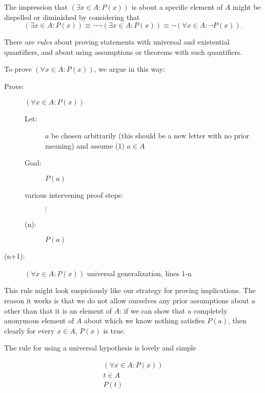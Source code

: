 \documentclass[12pt]{article}
\begin{document}
The impression that $(\exists x \in A:P(x))$ is about a specific element of $A$ might be dispelled or diminished by considering that
$$(\exists x \in A:P(x)) \equiv \neg\neg (\exists x \in A:P(x)) \equiv \neg(\forall x\in A : \neg P(x)).$$

There are {\em rules\/} about proving statements with universal and existential quantifiers, and about using assumptions or theorems with such quantifiers.

To prove $(\forall x \in A:P(x))$, we argue in this way:

\begin{description}
\item[Prove:]  $(\forall x \in A:P(x))$

\begin{description}

\item[Let:]  $a$ be chosen arbitrarily (this should be a new letter with no prior meaning) and assume (1) $a \in A$
\item[Goal:]  $P(a)$

\item[various intervening proof steps:] $\vdots$

\item[(n):]  $P(a)$

\end{description}

\item[(n+1):]  $(\forall x\in A:P(x))$ universal generalization, lines 1-n

\end{description}

This rule might look suspiciously like our strategy for proving implications.  The reason it works is that we do not allow ourselves any prior assumptions about $a$ other than that it is an element of $A$:  if we can show that a completely anonymous element of $A$ about which we know nothing satisfies $P(a)$, then clearly for every $x\in A$, $P(x)$ is true.

The rule for using a universal hypothesis is lovely and simple

$$\begin{array}{c}

(\forall x \in A:P(x)) \\

t \in A \\ \hline

P(t)
\end{array}$$
\end{document}
